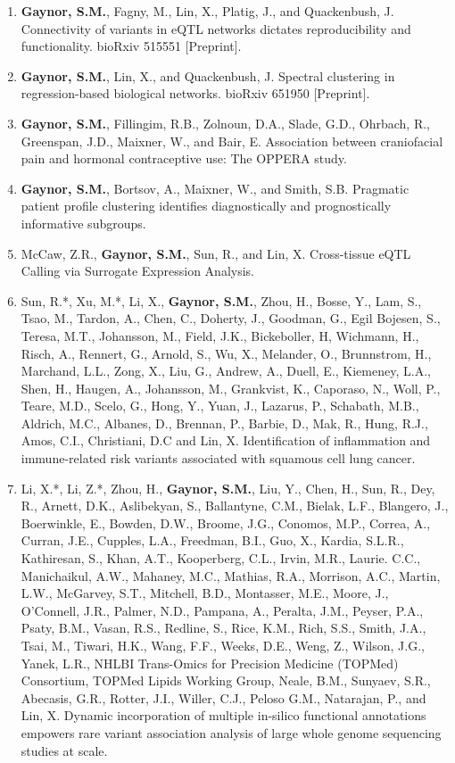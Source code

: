 \documentclass[10pt]{article}
\begin{document}
\begin{enumerate}
\item \textbf{Gaynor, S.M.}, Fagny, M., Lin, X., Platig, J., and Quackenbush, J. Connectivity of variants in eQTL networks dictates reproducibility and functionality. bioRxiv 515551 [Preprint].  
\item \textbf{Gaynor, S.M.}, Lin, X., and Quackenbush, J. Spectral clustering in regression-based biological networks. bioRxiv 651950 [Preprint].
\item \textbf{Gaynor, S.M.}, Fillingim, R.B., Zolnoun, D.A., Slade, G.D., Ohrbach, R., Greenspan, J.D., Maixner, W.,  and Bair, E. Association between craniofacial pain and hormonal contraceptive use: The OPPERA study.
\item \textbf{Gaynor, S.M.}, Bortsov, A., Maixner, W.,  and Smith, S.B. Pragmatic patient profile clustering identifies diagnostically and prognostically informative subgroups.
\item McCaw, Z.R., \textbf{Gaynor, S.M.}, Sun, R.,  and Lin, X. Cross-tissue eQTL Calling via Surrogate Expression Analysis.
\item Sun, R.*, Xu, M.*, Li, X., \textbf{Gaynor, S.M.}, Zhou, H., Bosse, Y., Lam, S., Tsao, M., Tardon, A., Chen, C., Doherty, J., Goodman, G., Egil Bojesen, S., Teresa, M.T., Johansson, M., Field, J.K., Bickeboller, H, Wichmann, H., Risch, A., Rennert, G., Arnold, S., Wu, X., Melander, O., Brunnstrom, H.,
Marchand, L.L., Zong, X., Liu, G., Andrew, A., Duell, E., Kiemeney, L.A., Shen, H., Haugen, A.,
Johansson, M., Grankvist, K., Caporaso, N., Woll, P., Teare, M.D., Scelo, G., Hong, Y., Yuan, J.,
Lazarus, P., Schabath, M.B., Aldrich, M.C., Albanes, D., Brennan, P., Barbie, D., Mak, R., Hung,
R.J., Amos, C.I., Christiani, D.C and Lin, X. Identification of inflammation and immune-related risk variants associated with squamous cell lung cancer.
\item Li, X.*, Li, Z.*, Zhou, H., \textbf{Gaynor, S.M.}, Liu, Y., Chen, H., Sun, R., Dey, R., Arnett, D.K., Aslibekyan, S., Ballantyne, C.M., Bielak, L.F., Blangero, J., Boerwinkle, E., Bowden, D.W., Broome, J.G., Conomos, M.P., Correa, A., Curran, J.E., Cupples, L.A., Freedman, B.I.,  Guo, X., Kardia, S.L.R., Kathiresan, S., Khan, A.T.,  Kooperberg, C.L., Irvin, M.R., Laurie. C.C., Manichaikul, A.W., Mahaney, M.C., Mathias, R.A., Morrison, A.C., Martin, L.W., McGarvey, S.T., Mitchell, B.D., Montasser, M.E.,  Moore, J.,  O’Connell, J.R., Palmer, N.D., Pampana, A.,  Peralta, J.M.,  Peyser, P.A.,  Psaty, B.M., Vasan, R.S., Redline, S., Rice, K.M., Rich, S.S., Smith, J.A.,  Tsai, M., Tiwari, H.K., Wang, F.F., Weeks, D.E., Weng, Z., Wilson, J.G., Yanek, L.R., NHLBI Trans-Omics for Precision Medicine (TOPMed) Consortium, TOPMed Lipids Working Group, Neale, B.M., Sunyaev, S.R., Abecasis, G.R.,  Rotter, J.I.,  Willer, C.J., Peloso G.M., Natarajan, P., and Lin, X. Dynamic incorporation of multiple in-silico functional annotations empowers rare variant association analysis of large whole genome sequencing studies at scale.

\end{enumerate}
\end{document}
